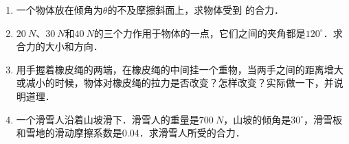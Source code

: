 \begin{exercises}
\begin{enumerate}
    \item 一个物体放在倾角为$\theta$的不及摩擦斜面上，求物体受到
          的合力．
          \begin{figure}[H]
              \centering
              \caption{}
          \end{figure}

    \item $\qty{20}{N}$、$\qty{30}{N}$和$\qty{40}{N}$的三个力作用于物体的一点，它们之间的夹角都是$120^\circ$．求合力的大小和方向．

    \item 用手握着橡皮绳的两端，在橡皮绳的中间挂一个重物，当两手之间的距离增大或减小的时候，物体对橡皮绳的拉力是否改变？怎样改变？实际做一下，并说明道理．

    \item 一个滑雪人沿着山坡滑下．滑雪人的重量是$\qty{700}{N}$，山坡的倾角是$30^\circ$，滑雪板和雪地的滑动摩擦系数是0.04．求滑雪人所受的合力．


\end{enumerate}
\end{exercises}
